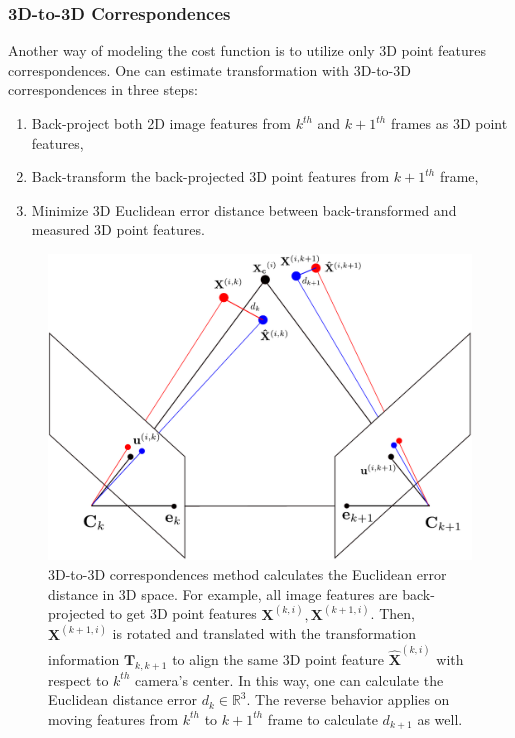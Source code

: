 \documentclass[a4paper]{report}
\numberwithin{figure}{section}
\newcommand{\R}{\mathbb{R}}
\begin{document}
\subsubsection{3D-to-3D Correspondences}\label{sb_sc_3d_to_3d}

Another way of modeling the cost function is to utilize only 3D point features 
correspondences. One can estimate transformation with 3D-to-3D 
correspondences in three steps:

\begin{enumerate}
  \item Back-project both 2D image features from $k^{th}$ and $k+1^{th}$ 
  frames as 3D point features, 
  \item Back-transform the back-projected 3D point features from $k+1^{th}$ 
  frame,
  \item Minimize 3D Euclidean error distance between back-transformed and 
  measured 3D point features.
\end{enumerate}

\begin{figure}[H]
	\centering
	\includegraphics[width=0.9\linewidth,natwidth=640,natheight=640]
	{fig/drawings/3d_to_3d.pdf}
	\caption[3D-to-3D Correspondences]
	{3D-to-3D correspondences method calculates the Euclidean error distance 
	in 
	3D space. For example, all image features are 
	back-projected to get 3D point features 
	$\mathbf{X}^{(k,i)},\mathbf{X}^{(k+1,i)}$. Then, $\mathbf{X}^{(k+1,i)}$ is 
	rotated and translated with the transformation information 
	$\mathbf{T}_{k,k+1}$ to align the same 3D point feature 
	$\mathbf{\hat{X}}^{(k,i)}$ with respect to $k^{th}$ camera's center. In 
	this 
	way, one can calculate the Euclidean distance error $d_k \in \R^3$. 
	The reverse 
	behavior applies on moving features from $k^{th}$ to $k+1^{th}$ frame to 
	calculate $d_{k+1}$ as well.}
	\label{fig:min_euclidean_error}
\end{figure}
\end{document}

